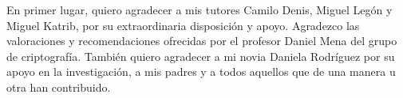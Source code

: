 \begin{acknowledgements}
En primer lugar, quiero agradecer a mis tutores Camilo Denis, Miguel Leg\'on y Miguel Katrib, por su extraordinaria disposici\'on y apoyo. Agradezco las valoraciones y recomendaciones ofrecidas por el profesor Daniel Mena del grupo de criptograf\'ia. Tambi\'en quiero agradecer a mi novia Daniela Rodr\'iguez por su apoyo en la investigaci\'on, a mis padres y a todos aquellos que de una manera u otra han contribuido.
\end{acknowledgements}
